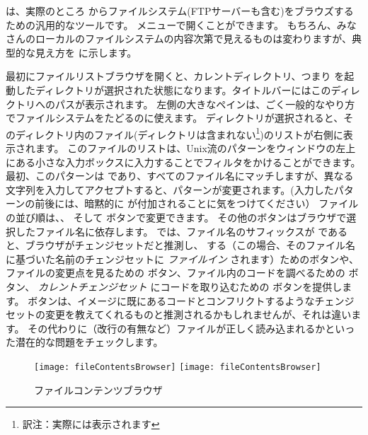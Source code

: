 \documentclass[a4paper,10pt,twoside]{book}
\begin{document}
 は、実際のところ \pharo からファイルシステム(FTPサーバーも含む)をブラウズするための汎用的なツールです。
 メニューで開くことができます。
もちろん、みなさんのローカルのファイルシステムの内容次第で見えるものは変わりますが、典型的な見え方を  に示します。

最初にファイルリストブラウザを開くと、カレントディレクトリ、つまり \pharo を起動したディレクトリが選択された状態になります。タイトルバーにはこのディレクトリへのパスが表示されます。
左側の大きなペインは、ごく一般的なやり方でファイルシステムをたどるのに使えます。
ディレクトリが選択されると、そのディレクトリ内のファイル(ディレクトリは含まれない\footnote{訳注：実際には表示されます})のリストが右側に表示されます。
このファイルのリストは、Unix流のパターンをウィンドウの左上にある小さな入力ボックスに入力することでフィルタをかけることができます。
最初、このパターンは \ct{*} であり、すべてのファイル名にマッチしますが、異なる文字列を入力してアクセプトすると、パターンが変更されます。(入力したパターンの前後には、暗黙的に \ct{*} が付加されることに気をつけてください）
ファイルの並び順は、、 そして  ボタンで変更できます。
その他のボタンはブラウザで選択したファイル名に依存します。
 では、ファイル名のサフィックスが  であると、ブラウザがチェンジセットだと推測し、 する（この場合、そのファイル名に基づいた名前のチェンジセットに \textit{ファイルイン} されます）ためのボタンや、ファイルの変更点を見るための  ボタン、ファイル内のコードを調べるための  ボタン、
\emph{カレントチェンジセット} にコードを取り込むための ボタンを提供します。
 ボタンは、イメージに既にあるコードとコンフリクトするようなチェンジセットの変更を教えてくれるものと推測されるかもしれませんが、それは違います。
その代わりに（改行の有無など）ファイルが正しく読み込まれるかといった潜在的な問題をチェックします。

\begin{figure}[btp]
\begin{center}
\ifluluelse
{\texttt{[image: fileContentsBrowser]}}
{\texttt{[image: fileContentsBrowser]}}
\end{center}
\caption{ファイルコンテンツブラウザ}
\end{figure}
\end{document}
